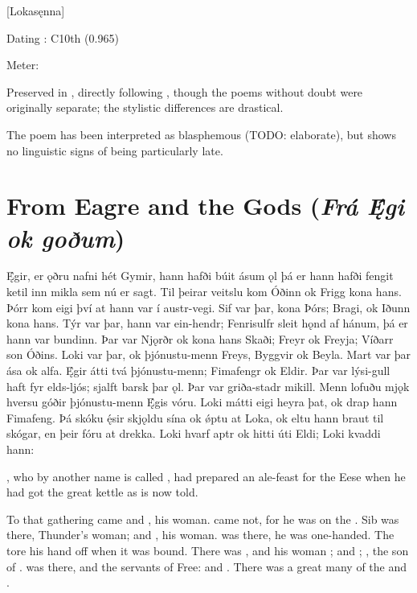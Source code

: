 [Lokasęnna]

\begin{flushright}%
Dating \parencite{Sapp2022}: C10th (0.965)

Meter: \Ljodahattr%
\end{flushright}

Preserved in \Regius, directly following \Hymiskvida, though the poems without doubt were originally separate; the stylistic differences are drastical.

The poem has been interpreted as blasphemous (TODO: elaborate), but shows no linguistic signs of being particularly late.

\sectionline

\section{From Eagre and the Gods (\emph{Frá Ę́gi ok goðum})}

\bpg\bpa Ę́gir, er ǫðru nafni hét Gymir, hann hafði búit ásum ǫl þá er hann hafði fengit ketil inn mikla sem nú er sagt. Til þeirar veitslu kom Óðinn ok Frigg kona hans. Þórr kom eigi því at hann var í austr-vegi. Sif var þar, kona Þórs; Bragi, ok Iðunn kona hans. Týr var þar, hann var ein-hendr; Fenrisulfr sleit hǫnd af hánum, þá er hann var bundinn. Þar var Njǫrðr ok kona hans Skaði; Freyr ok Freyja; Víðarr son Óðins. Loki var þar, ok þjónustu-menn Freys, Byggvir ok Beyla. Mart var þar ása ok alfa. Ę́gir átti tvá þjónustu-menn; Fimafengr ok Eldir. Þar var lýsi-gull haft fyr elds-ljós; sjalft barsk þar ǫl. Þar var griða-stadr mikill. Menn lofuðu mjǫk hversu góðir þjónustu-menn Ę́gis vóru. Loki mátti eigi heyra þat, ok drap hann Fimafeng. Þá skóku ę́sir skjǫldu sína ok ǿptu at Loka, ok eltu hann braut til skógar, en þeir fóru at drekka. Loki hvarf aptr ok hitti úti Eldi; Loki kvaddi hann:\epa

\bpb {}, who by another name is called , had prepared an ale-feast for the Eese when he had got the great kettle as is now told.

To that gathering came  and , his woman.  came not, for he was on the . Sib was there, Thunder’s woman;  and , his woman.  was there, he was one-handed. The  tore his hand off when it was bound. There was , and his woman ;  and ; , the son of .  was there, and the servants of Free:  and . There was a great many of the  and .

